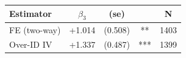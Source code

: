 \begin{tabular}{lcccc}
\hline Estimator & $\beta_3$ & (se) & & N \\ \hline
FE (two-way) & +1.014 & (0.508) & ** & 1403 \\
Over-ID IV & +1.337 & (0.487) & *** & 1399 \\
\hline
\end{tabular}
